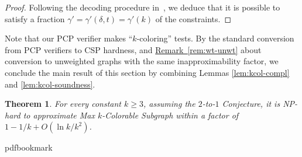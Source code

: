 \documentclass[10pt]{article}
\newtheorem{theorem}{Theorem}[section]
\theoremstyle{definition}
\numberwithin{equation}{section}
\newcommand{\expref}[2]{\texorpdfstring{\hyperref[#2]{#1~\ref{#2}}}{#1~\ref{#2}}}
\newcommand{\dtoone}[1]{{\sf ${#1}$-to-$1$}}
\newcommand{\maxcolor}[1]{\texorpdfstring{\textsf{Max ${#1}$-Colorable Subgraph}}{Max {#1}-Colorable Subgraph}}
\newcommand{\cclass}[1]{\textsf{#1}}
\renewcommand{\ge}{\geqslant}
\begin{document}
\begin{proof}
    Following the decoding procedure in~\cite{KKMO}, we deduce that it
    is possible to satisfy a fraction $\gamma' = \gamma'(\delta,t) =
    \gamma'(k)$
    of the constraints.
\end{proof}

%
Note that our PCP verifier makes ``$k$-coloring'' tests. By the
standard conversion from PCP verifiers to CSP hardness, and
\expref{Remark}{rem:wt-unwt} about conversion to unweighted graphs with
the same inapproximability factor, we conclude the main result of this
section by combining Lemmas \ref{lem:kcol-compl} and
\ref{lem:kcol-soundness}.
\begin{theorem}
  For every constant $k \ge 3$, assuming the \dtoone{2} Conjecture, it
  is \cclass{NP}-hard to approximate \maxcolor{k} within a factor of
  $1-1/k+O(\ln k/k^2)$.
\end{theorem}
\clearpage
\begingroup\raggedright
%
%
%
%
%
\providecommand{\bibhead}[1]{}
%
\expandafter\ifx\csname pdfbookmark\endcsname\relax%
  \providecommand{\tocrefpdfbookmark}{}
\else\providecommand{\tocrefpdfbookmark}{%
   \hypertarget{tocreferences}{}%
   \pdfbookmark[1]{References}{tocreferences}}%
\fi
\end{document}
